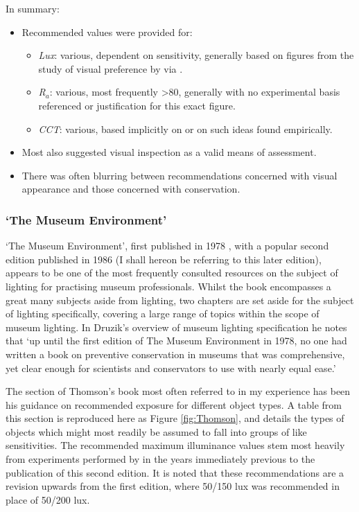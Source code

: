 \noindent
In summary:
\begin{itemize}
\item Recommended values were provided for:
\begin{itemize}
\item \emph{Lux}: various, dependent on sensitivity, generally based on figures from the study of visual preference by \citet{loe_preferred_1982} via \citet{thomson_museum_1978}.
\item \emph{R$_a$}: various, most frequently \textgreater 80, generally with no experimental basis referenced or justification for this exact figure.
\item \emph{\gls{CCT}}: various, based implicitly on \citet{kruithof_tubular_1941} or on such ideas found empirically.
\end{itemize}
\item Most also suggested visual inspection as a valid means of assessment.
\item There was often blurring between recommendations concerned with visual appearance and those concerned with conservation. 
\end{itemize}

\subsubsection{`The Museum Environment'}

`The Museum Environment', first published in 1978 \citep{thomson_museum_1978}, with a popular second edition published in 1986 \citep{thomson_museum_1986} (I shall hereon be referring to this later edition), appears to be one of the most frequently consulted resources on the subject of lighting for practising museum professionals. Whilst the book encompasses a great many subjects aside from lighting, two chapters are set aside for the subject of lighting specifically, covering a large range of topics within the scope of museum lighting. In Druzik's overview of museum lighting specification \citep{druzik_museum_2007} he notes that `up until the first edition of The Museum Environment in 1978, no one had written a book on preventive conservation in museums that was comprehensive, yet clear enough for scientists and conservators to use with nearly equal ease.'

The section of Thomson's book most often referred to in my experience has been his guidance on recommended exposure for different object types. A table from this section is reproduced here as Figure \ref{fig:Thomson}, and details the types of objects which might most readily be assumed to fall into groups of like sensitivities. The recommended maximum illuminance values stem most heavily from experiments performed by \citet{loe_preferred_1982} in the years immediately previous to the publication of this second edition. It is noted that these recommendations are a revision upwards from the first edition, where 50/150 lux was recommended in place of 50/200 lux.

